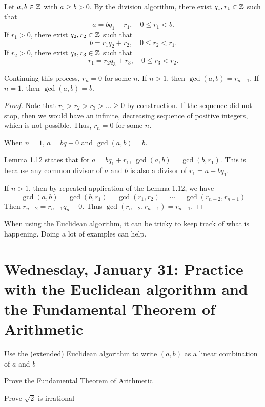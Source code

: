 \documentclass{ximera}
\begin{document}
\begin{thm}\label{euclid-alg}
	Let $a,b\in\mathbb Z$ with $a\geq b>0$. By the division algorithm, there exist $q_1,r_1\in\mathbb Z$ such that 
	\[a=b q_1+r_1,\quad 0\leq r_1<b.\]
	If $r_1>0$, there exist $q_2,r_2\in\mathbb Z$ such that 
	\[b=r_1 q_2+r_2,\quad 0\leq r_2<r_1.\]
	If $r_2>0$, there exist $q_3,r_3\in\mathbb Z$ such that 
	\[r_1=r_2 q_3+r_3,\quad 0\leq r_3<r_2.\]
	
	Continuing this process, $r_n=0$ for some $n$. If $n>1$, then $\gcd(a,b)=r_{n-1}$. If $n=1$, then $\gcd(a,b)=b$.
\end{thm}
\begin{proof}
	 Note that $r_1>r_2>r_3>\dots\geq0$ by construction. If the sequence did not stop, then we would have an infinite, decreasing sequence of positive integers, which is not possible. Thus, $r_n=0$ for some $n$. 
	 
	 When $n=1$, $a=bq+0$ and $\gcd(a,b)=b$.
	 
	 Lemma 1.12 states that for $a=bq_1+r_1$, $\gcd(a,b)=\gcd(b,r_1)$. This is because any common divisor of $a$ and $b$  is also a divisor of $r_1=a-bq_1$. 
	 
	 If $n>1$, then by repeated application of the Lemma 1.12, we have 
	 \[\gcd(a,b)=\gcd(b,r_1)=\gcd(r_1,r_2)=\cdots=\gcd(r_{n-2},r_{n-1})\]
	 Then $r_{n-2}=r_{n-1} q_n+0$. Thus $\gcd(r_{n-2},r_{n-1})=r_{n-1}$.
\end{proof}
	
	When using the Euclidean algorithm, it can be tricky to keep track of what is happening. Doing a lot of examples can help.
	
\section{Wednesday, January 31: Practice with the Euclidean algorithm and the Fundamental Theorem of Arithmetic}

\begin{obj}
\item  Use the (extended) Euclidean algorithm to write $(a,b)$ as a linear combination of $a$ and $b$
\item Prove the Fundamental Theorem of Arithmetic
\item  Prove $\sqrt{2}$ is irrational
\end{obj}
\end{document}
